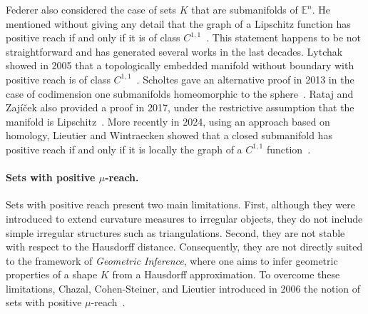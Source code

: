 \documentclass[11pt,reqno,a4paper]{article}%
\theoremstyle{definition}
\theoremstyle{remark}
\newcommand{\E}{\mathbb{E}}
\begin{document}
Federer also considered the case of sets $K$ that are submanifolds of $\E^n$. He mentioned without giving any detail that the graph of a Lipschitz function has positive reach if and only if it is of class $C^{1,1}$~\cite[Remark 4.20]{Federer59}. This statement happens to be not straightforward and has generated several works in the last decades. Lytchak showed in 2005 that a topologically embedded manifold without boundary with positive reach  is of class $C^{1,1}$~\cite{lytchak2005almost}. Scholtes gave an alternative proof in 2013  in the  case of codimension one submanifolds homeomorphic to the sphere~\cite{scholtes2013hypersurfaces}. Rataj and Zajíček also provided a proof in 2017, under the restrictive assumption that the manifold is Lipschitz~\cite{rataj2017structure}.
 More recently in 2024, using an approach based on homology, Lieutier and Wintraecken showed that a closed submanifold has positive reach if and only if it is locally the graph of a $C^{1,1}$ function~\cite{lieutier2024manifolds}. 
 
\paragraph{Sets with positive $\mu$-reach.} Sets with positive reach present two main limitations. First, although they were introduced to extend curvature measures to irregular objects, they do not include simple irregular structures such as triangulations. Second, they are not stable with respect to the Hausdorff distance. Consequently, they are not directly suited to the framework of \textit{Geometric Inference}, where one aims to infer geometric properties of a shape $K$ from a Hausdorff approximation. To overcome these limitations, Chazal, Cohen-Steiner, and Lieutier introduced in 2006 the notion of sets with positive 
$\mu$-reach~\cite{chazal2006sampling,Chazal-Lieutier}.
\end{document}
